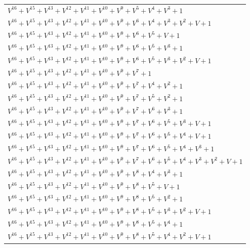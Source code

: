 \documentclass[12pt]{article}
\begin{document}
\begin{adjustwidth}{-4cm}{}
\begin{center}
\begin{longtable}{|l|}
$V^{16}  +V^{15}  +V^{13}  +V^{12}  +V^{11}  +V^{10}  +V^{9}  +V^{5}  +V^{4}  +V^{3}  + 1$ \\
$V^{16}  +V^{15}  +V^{13}  +V^{12}  +V^{11}  +V^{10}  +V^{9}  +V^{6}  +V^{4}  +V^{3}  +V^{2}  + V + 1$ \\
$V^{16}  +V^{15}  +V^{13}  +V^{12}  +V^{11}  +V^{10}  +V^{9}  +V^{6}  +V^{5}  + V + 1$ \\
$V^{16}  +V^{15}  +V^{13}  +V^{12}  +V^{11}  +V^{10}  +V^{9}  +V^{6}  +V^{5}  +V^{3}  + 1$ \\
$V^{16}  +V^{15}  +V^{13}  +V^{12}  +V^{11}  +V^{10}  +V^{9}  +V^{6}  +V^{5}  +V^{3}  +V^{2}  + V + 1$ \\
$V^{16}  +V^{15}  +V^{13}  +V^{12}  +V^{11}  +V^{10}  +V^{9}  +V^{7}  + 1$ \\
$V^{16}  +V^{15}  +V^{13}  +V^{12}  +V^{11}  +V^{10}  +V^{9}  +V^{7}  +V^{4}  +V^{2}  + 1$ \\
$V^{16}  +V^{15}  +V^{13}  +V^{12}  +V^{11}  +V^{10}  +V^{9}  +V^{7}  +V^{5}  +V^{2}  + 1$ \\
$V^{16}  +V^{15}  +V^{13}  +V^{12}  +V^{11}  +V^{10}  +V^{9}  +V^{7}  +V^{6}  +V^{3}  + 1$ \\
$V^{16}  +V^{15}  +V^{13}  +V^{12}  +V^{11}  +V^{10}  +V^{9}  +V^{7}  +V^{6}  +V^{5}  +V^{3}  + V + 1$ \\
$V^{16}  +V^{15}  +V^{13}  +V^{12}  +V^{11}  +V^{10}  +V^{9}  +V^{7}  +V^{6}  +V^{5}  +V^{4}  + V + 1$ \\
$V^{16}  +V^{15}  +V^{13}  +V^{12}  +V^{11}  +V^{10}  +V^{9}  +V^{7}  +V^{6}  +V^{5}  +V^{4}  +V^{3}  + 1$ \\
$V^{16}  +V^{15}  +V^{13}  +V^{12}  +V^{11}  +V^{10}  +V^{9}  +V^{7}  +V^{6}  +V^{5}  +V^{4}  +V^{3}  +V^{2}  + V + 1$ \\
$V^{16}  +V^{15}  +V^{13}  +V^{12}  +V^{11}  +V^{10}  +V^{9}  +V^{8}  +V^{4}  +V^{3}  + 1$ \\
$V^{16}  +V^{15}  +V^{13}  +V^{12}  +V^{11}  +V^{10}  +V^{9}  +V^{8}  +V^{5}  + V + 1$ \\
$V^{16}  +V^{15}  +V^{13}  +V^{12}  +V^{11}  +V^{10}  +V^{9}  +V^{8}  +V^{5}  +V^{2}  + 1$ \\
$V^{16}  +V^{15}  +V^{13}  +V^{12}  +V^{11}  +V^{10}  +V^{9}  +V^{8}  +V^{5}  +V^{3}  +V^{2}  + V + 1$ \\
$V^{16}  +V^{15}  +V^{13}  +V^{12}  +V^{11}  +V^{10}  +V^{9}  +V^{8}  +V^{5}  +V^{4}  + 1$ \\
$V^{16}  +V^{15}  +V^{13}  +V^{12}  +V^{11}  +V^{10}  +V^{9}  +V^{8}  +V^{5}  +V^{4}  +V^{2}  + V + 1$ \\

\end{longtable}
\end{center}
\end{adjustwidth}
\end{document}

